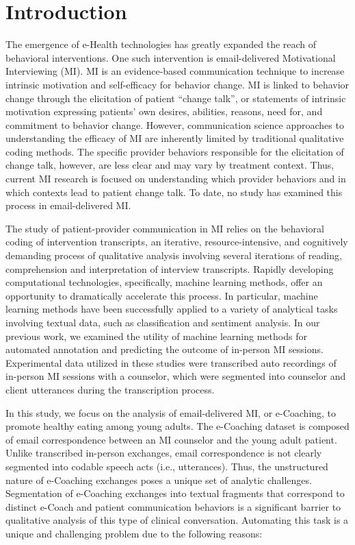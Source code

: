 \documentclass{amia}
\begin{document}
\section*{Introduction}
The emergence of e-Health technologies has greatly expanded the reach of behavioral interventions. One such intervention is email-delivered Motivational Interviewing (MI). MI is an evidence-based communication technique to increase intrinsic motivation and self-efficacy for behavior change\cite{miller2012motivational,miller2009toward}. MI is linked to behavior change through the elicitation of patient ``change talk'', or statements of intrinsic motivation expressing patients’ own desires, abilities, reasons, need for, and commitment to behavior change\cite{apodaca2009mechanisms}. However, communication science approaches to understanding the efficacy of MI are inherently limited by traditional qualitative coding methods. The specific provider behaviors responsible for the elicitation of change talk, however, are less clear and may vary by treatment context. Thus, current MI research is focused on understanding which provider behaviors and in which contexts lead to patient change talk. To date, no study has examined this process in email-delivered MI.

The study of patient-provider communication in MI relies on the behavioral coding of intervention transcripts, an iterative, resource-intensive, and cognitively demanding process of qualitative analysis involving several iterations of reading, comprehension and interpretation of interview transcripts. Rapidly developing computational technologies, specifically, machine learning methods, offer an opportunity to dramatically accelerate this process. In particular, machine learning methods have been successfully applied to a variety of analytical tasks involving textual data, such as classification\cite{nigam2000text} and sentiment analysis.\cite{wang2012baselines} In our previous work, we examined the utility of machine learning methods for automated annotation \cite{hasan2016study,kotov2015interpretable} and predicting the outcome \cite{hasan2018predicting} of in-person MI sessions. Experimental data utilized in these studies were transcribed auto recordings of in-person MI sessions with a counselor, which were segmented into counselor and client utterances during the transcription process. 

In this study, we focus on the analysis of email-delivered MI, or e-Coaching, to promote healthy eating among young adults. The e-Coaching dataset is composed of email correspondence between an MI counselor and the young adult patient. Unlike transcribed in-person exchanges, email correspondence is not clearly segmented into codable speech acts (i.e., utterances). Thus, the unstructured nature of e-Coaching exchanges poses a unique set of analytic challenges. Segmentation of e-Coaching exchanges into textual fragments that correspond to distinct e-Coach and patient communication behaviors is a significant barrier to qualitative analysis of this type of clinical conversation. Automating this task is a unique and challenging problem due to the following reasons:
\end{document}
